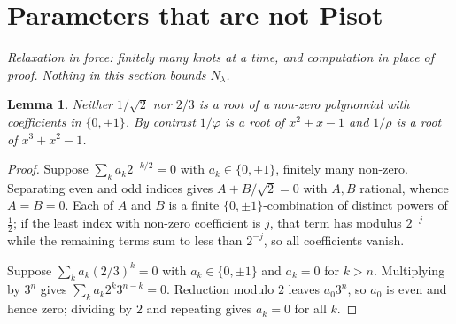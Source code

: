 \documentclass[11pt,reqno]{amsart}
\theoremstyle{plain}
\newtheorem{lemma}[theorem]{Lemma}
\theoremstyle{definition}
\theoremstyle{remark}
\begin{document}
\section{Parameters that are not Pisot}\label{sec:nonpisot}

\emph{Relaxation in force: finitely many knots at a time, and computation in
place of proof. Nothing in this section bounds $N_\lambda$.}

\begin{lemma}\label{lem:overlap}
Neither $1/\sqrt2$ nor $2/3$ is a root of a non-zero polynomial with
coefficients in $\{0,\pm1\}$. By contrast $1/\varphi$ is a root of $x^2+x-1$ and
$1/\rho$ is a root of $x^3+x^2-1$.
\end{lemma}

\begin{proof}
Suppose $\sum_k a_k 2^{-k/2}=0$ with $a_k\in\{0,\pm1\}$, finitely many non-zero.
Separating even and odd indices gives $A+B/\sqrt2=0$ with $A,B$ rational, whence
$A=B=0$. Each of $A$ and $B$ is a finite $\{0,\pm1\}$-combination of distinct
powers of $\tfrac12$; if the least index with non-zero coefficient is $j$, that
term has modulus $2^{-j}$ while the remaining terms sum to less than $2^{-j}$,
so all coefficients vanish.

Suppose $\sum_k a_k(2/3)^k=0$ with $a_k\in\{0,\pm1\}$ and $a_k=0$ for $k>n$.
Multiplying by $3^n$ gives $\sum_k a_k2^k3^{n-k}=0$. Reduction modulo $2$ leaves
$a_0 3^n$, so $a_0$ is even and hence zero; dividing by $2$ and repeating gives
$a_k=0$ for all $k$.
\end{proof}
\end{document}
